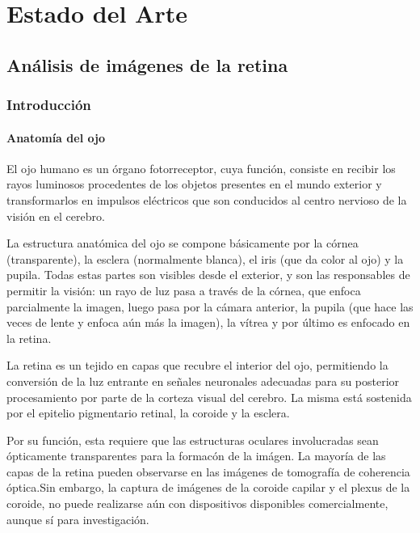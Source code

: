 
\chapter{Estado del Arte} %

\label{Chapter2} %


\section{An\'alisis  de im\'agenes de la retina}

	\subsection{Introducci\'on}

		\subsubsection{Anatom\'ia del ojo}

El ojo humano es un órgano fotorreceptor, cuya función, consiste en recibir los rayos luminosos procedentes de los objetos presentes en el mundo exterior y transformarlos en impulsos eléctricos que son conducidos al centro nervioso de la visión en el cerebro. 

La estructura anatómica del ojo se compone básicamente por la córnea (transparente), la esclera (normalmente blanca), el iris (que da color al ojo) y la pupila. Todas estas partes son visibles desde el exterior, y son las responsables de permitir la visión: un rayo de luz pasa a través de la córnea, que enfoca parcialmente la imagen, luego pasa por la cámara anterior, la pupila (que hace las veces de lente y enfoca aún más la imagen), la vítrea y por último es enfocado en la retina.

La retina es un tejido en capas que recubre el interior del ojo, permitiendo la conversión de la luz entrante en señales neuronales adecuadas para su posterior procesamiento por parte de la corteza visual del cerebro. La misma está sostenida por el epitelio pigmentario retinal, la coroide y la esclera.

Por su funci\'on, esta requiere que las estructuras oculares involucradas sean \'opticamente transparentes para la formac\'on de la im\'agen.
La mayoría de las capas de la retina pueden observarse en las imágenes de tomografía de coherencia óptica.Sin embargo, la captura de imágenes de la coroide capilar y el plexus de la coroide, no puede realizarse aún con dispositivos disponibles comercialmente, aunque sí para investigación.\cite{abramoff2010retinal}

